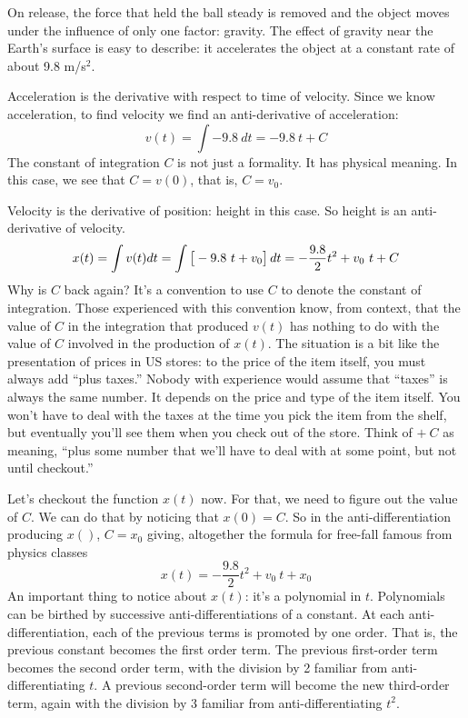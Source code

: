 \documentclass[
  letterpaper,
  DIV=11,
  numbers=noendperiod,
  oneside]{scrreprt}
\begin{document}
On release, the force that held the ball steady is removed and the
object moves under the influence of only one factor: gravity. The effect
of gravity near the Earth's surface is easy to describe: it accelerates
the object at a constant rate of about 9.8 m/s\(^2\).

Acceleration is the derivative with respect to time of velocity. Since
we know acceleration, to find velocity we find an anti-derivative of
acceleration: \[v(t) = \int -9.8\ dt = -9.8\ t + C\] The constant of
integration \(C\) is not just a formality. It has physical meaning. In
this case, we see that \(C=v(0)\), that is, \(C = v_0\).

Velocity is the derivative of position: height in this case. So height
is an anti-derivative of velocity.
\[x(t) = \int v(t) dt = \int \left[\strut -9.8\ t + v_0\right]dt = - \frac{9.8}{2} t^2 + v_0\ t + C\]
Why is \(C\) back again? It's a convention to use \(C\) to denote the
constant of integration. Those experienced with this convention know,
from context, that the value of \(C\) in the integration that produced
\(v(t)\) has nothing to do with the value of \(C\) involved in the
production of \(x(t)\). The situation is a bit like the presentation of
prices in US stores: to the price of the item itself, you must always
add ``plus taxes.'' Nobody with experience would assume that ``taxes''
is always the same number. It depends on the price and type of the item
itself. You won't have to deal with the
taxes at the time you pick the item from the shelf, but eventually
you'll see them when you check out of the store. Think of \(+\ C\) as
meaning, ``plus some number that we'll have to deal with at some point,
but not until checkout.''

Let's checkout the function \(x(t)\) now. For that, we need to figure
out the value of \(C\). We can do that by noticing that \(x(0) = C\). So
in the anti-differentiation producing \(x()\), \(C = x_0\) giving,
altogether the formula for free-fall famous from physics classes
\[x(t) =  - \frac{9.8}{2} t^2 + v_0\ t + x_0\] An important thing to
notice about \(x(t)\): it's a polynomial in \(t\). Polynomials can be
birthed by successive anti-differentiations of a constant. At each
anti-differentiation, each of the previous terms is promoted by one
order. That is, the previous constant becomes the first order term. The
previous first-order term becomes the second order term, with the
division by 2 familiar from anti-differentiating \(t\). A previous
second-order term will become the new third-order term, again with the
division by 3 familiar from anti-differentiating \(t^2\).
\end{document}

